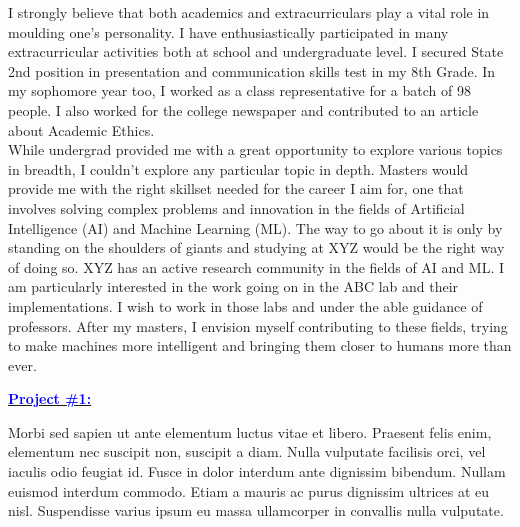 \documentclass{article}
\newcommand{\statement}[1]{\par\medskip
  \underline{\textcolor{blue}{\textbf{#1:}}}\space
}
\begin{document}
I strongly believe that both academics and extracurriculars play a vital role in moulding one’s personality. I have enthusiastically participated in many extracurricular activities both at school and undergraduate level. I secured State 2nd position in presentation and communication skills test in my 8th Grade. In my sophomore year too, I worked as a class representative for a batch of 98 people. I also worked for the college newspaper and contributed to an article about Academic Ethics. 
\\

While undergrad provided me with a great opportunity to explore various topics in breadth, I couldn’t explore any particular topic in depth. Masters would provide me with the right skillset needed for the career I aim for, one that involves solving complex problems and innovation in the fields of Artificial Intelligence (AI) and Machine Learning (ML). The way to go about it is only by standing on the shoulders of giants and studying at XYZ would be the right way of doing so. XYZ has an active research community in the fields of AI and ML. I am particularly interested in the work going on in the ABC lab and their implementations. I wish to work in those labs and under the able guidance of professors. After my masters, I envision myself contributing to these fields, trying to make machines more intelligent and bringing them closer to humans more than ever.


\statement{Project \#1}
Morbi sed sapien ut ante elementum luctus vitae et libero. Praesent
felis enim, elementum nec suscipit non, suscipit a diam. Nulla
vulputate facilisis orci, vel iaculis odio feugiat id. Fusce in dolor
interdum ante dignissim bibendum. Nullam euismod interdum commodo.
Etiam a mauris ac purus dignissim ultrices at eu nisl. Suspendisse
varius ipsum eu massa ullamcorper in convallis nulla vulputate.
\end{document}
